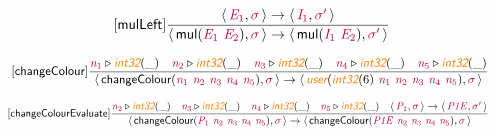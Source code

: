 \documentclass[10pt,leqno,fleqn]{article}
\newcommand{\artVariable}[1]{\mbox{\color{purple}\em #1\/}}
\newcommand{\artConstructor}[1]{\mbox{\sf #1}}
\newcommand{\artSpecial}[1]{\mbox{\color{orange}\sf\em #1}}
\begin{document}
\begin{equation}
\tag*{[\artConstructor{\sf mulLeft}]}
\begin{split}\frac{\langle\, \artVariable{E$_{1}$}, \artVariable{$\sigma$}\,\rangle \rightarrow \langle\, \artVariable{I$_{1}$}, \artVariable{$\sigma$\/$^\prime$}\,\rangle }{\langle\, \artConstructor{\sf mul}(\artVariable{E$_{1}$}\ \artVariable{E$_{2}$}), \artVariable{$\sigma$}\,\rangle \rightarrow \langle\, \artConstructor{\sf mul}(\artVariable{I$_{1}$}\ \artVariable{E$_{2}$}), \artVariable{$\sigma$\/$^\prime$}\,\rangle }
\end{split}
\end{equation}

\begin{equation}
\tag*{[\artConstructor{\sf changeColour}]}
\begin{split}\frac{ \artVariable{n$_{1}$}\triangleright \artSpecial{int32}(\_) \quad  \artVariable{n$_{2}$}\triangleright \artSpecial{int32}(\_) \quad  \artVariable{n$_{3}$}\triangleright \artSpecial{int32}(\_) \quad  \artVariable{n$_{4}$}\triangleright \artSpecial{int32}(\_) \quad  \artVariable{n$_{5}$}\triangleright \artSpecial{int32}(\_) }{\langle\, \artConstructor{\sf changeColour}(\artVariable{n$_{1}$}\ \artVariable{n$_{2}$}\ \artVariable{n$_{3}$}\ \artVariable{n$_{4}$}\ \artVariable{n$_{5}$}), \artVariable{$\sigma$}\,\rangle \rightarrow \langle\, \artSpecial{user}(\artSpecial{int32}(6)\ \artVariable{n$_{1}$}\ \artVariable{n$_{2}$}\ \artVariable{n$_{3}$}\ \artVariable{n$_{4}$}\ \artVariable{n$_{5}$}), \artVariable{$\sigma$}\,\rangle }
\end{split}
\end{equation}

\begin{equation}
\tag*{[\artConstructor{\sf changeColourEvaluate}]}
\begin{split}\frac{ \artVariable{n$_{2}$}\triangleright \artSpecial{int32}(\_) \quad  \artVariable{n$_{3}$}\triangleright \artSpecial{int32}(\_) \quad  \artVariable{n$_{4}$}\triangleright \artSpecial{int32}(\_) \quad  \artVariable{n$_{5}$}\triangleright \artSpecial{int32}(\_) \quad \langle\, \artVariable{P$_{1}$}, \artVariable{$\sigma$}\,\rangle \rightarrow \langle\, \artVariable{P1E}, \artVariable{$\sigma$\/$^\prime$}\,\rangle }{\langle\, \artConstructor{\sf changeColour}(\artVariable{P$_{1}$}\ \artVariable{n$_{2}$}\ \artVariable{n$_{3}$}\ \artVariable{n$_{4}$}\ \artVariable{n$_{5}$}), \artVariable{$\sigma$}\,\rangle \rightarrow \langle\, \artConstructor{\sf changeColour}(\artVariable{P1E}\ \artVariable{n$_{2}$}\ \artVariable{n$_{3}$}\ \artVariable{n$_{4}$}\ \artVariable{n$_{5}$}), \artVariable{$\sigma$}\,\rangle }
\end{split}
\end{equation}
\end{document}
